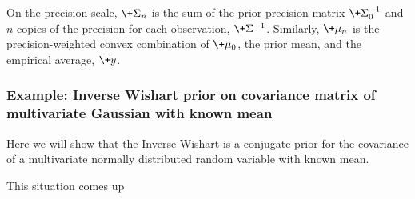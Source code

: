 \documentclass{article} %
\begin{document}
On the precision scale,  $\+\Sigma_n$ is the sum of the prior precision matrix $\+\Sigma_0^{-1}$ and $n$ copies of the precision for each observation,  $\+\Sigma^{-1}$.    Similarly,  $\+\mu_n$ is the precision-weighted convex combination of $\+\mu_0$, the prior mean, and the empirical average, $\bar{\+y}$.

\subsubsection{Example:  Inverse Wishart prior on covariance matrix of multivariate Gaussian with known mean} \label{sec:inverse_wishart_prior_on_mvn_with_known_mean}
 
Here we will show that the Inverse Wishart is a conjugate prior for the covariance of a multivariate normally distributed random variable with known mean.

This situation comes up 
\end{document}
